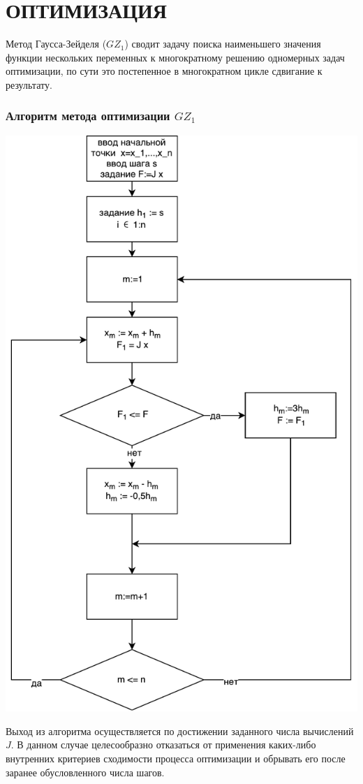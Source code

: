 \part{ОПТИМИЗАЦИЯ}
    Метод Гаусса-Зейделя ($GZ_1$) сводит задачу поиска наименьшего значения функции нескольких переменных к многократному решению одномерных задач оптимизации, по сути это постепенное в многократном цикле сдвигание к результату.
    \setcounter{section}{0}
    \section{Алгоритм метода оптимизации $GZ_1$}
        \begin{center}
            \includegraphics[scale=.6]{img/gz1-alg}
        \end{center}
        Выход из алгоритма осуществляется по достижении заданного числа вычислений $J$. В данном случае целесообразно отказаться от применения каких-либо внутренних критериев сходимости процесса оптимизации и обрывать его после заранее обусловленного числа шагов.

